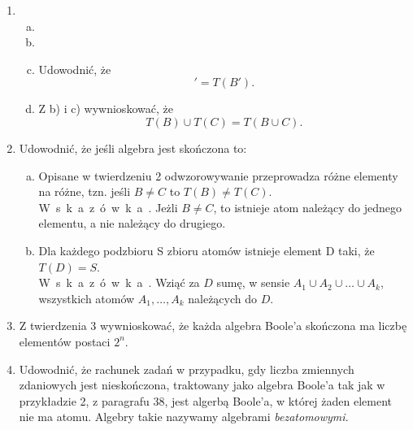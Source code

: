 \documentclass[b5paper,8 pt,leqno]{book}
\begin{document}
\begin{enumerate}
\small
\setcounter{enumi}{3}
\item
	\begin{enumerate}[a)]
		\item 
		\item 
		\newpage
		
		\item Udowodnić, że 
		\begin{equation*}
			[T(B)]' = T(B').
		\end{equation*}
		\item Z b) i c) wywnioskować, że
		\begin{equation*}
			T(B)\cup T(C) = T(B \cup C).
		\end{equation*}
	\end{enumerate} 
\item Udowodnić, że jeśli algebra jest skończona to:
\begin{enumerate}[a)]
	\item Opisane w twierdzeniu 2 odwzorowywanie przeprowadza różne elementy na różne,
	tzn. jeśli $B\neq C$ to $T(B) \neq T(C)$. \\
	W\ s\ k\ a\ z\ ó\ w\ k\ a\ . Jeżli $B\neq C$, to istnieje atom należący do jednego elementu,
	a nie należący do drugiego.
	
	\item Dla każdego podzbioru S zbioru atomów istnieje element D taki, że $T(D) = S$.\\
	W\ s\ k\ a\ z\ ó\ w\ k\ a\ . Wziąć za $D$ sumę, w sensie $A_1 \cup A_2 \cup \dots \cup A_k$, wszystkich atomów $A_1, \dots, A_k$ należących do $D$.
\end{enumerate}

\item Z twierdzenia 3 wywnioskować, że każda algebra Boole'a skończona ma liczbę elementów postaci $2^n$.

\item Udowodnić, że rachunek zadań w przypadku, gdy liczba zmiennych zdaniowych jest nieskończona, traktowany jako algebra Boole'a tak jak w przykładzie 2, z paragrafu 38, jest algerbą Boole'a, w której żaden element nie ma atomu. Algebry takie nazywamy algebrami \textit{bezatomowymi}.
\end{enumerate}
\end{document}
